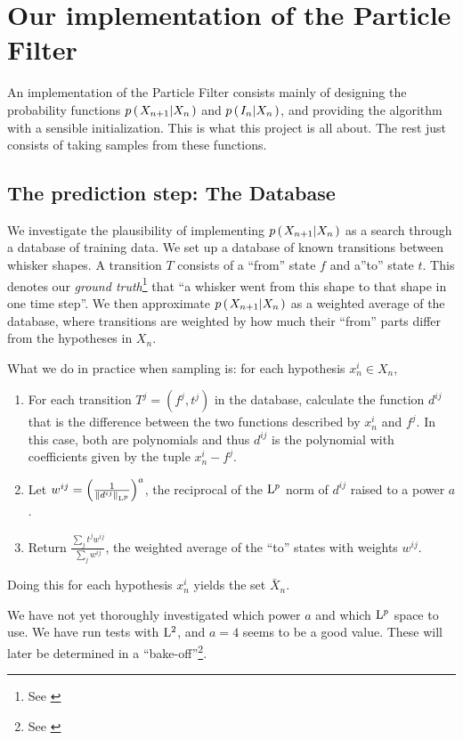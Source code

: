 \section*{Our implementation of the Particle Filter}
An implementation of the Particle Filter consists mainly of designing the probability functions $p\left(\left. X_{n+1} \middle\vert X_n \right.\right)$ and $p\left(\left. I_n \middle\vert X_n \right.\right)$, and providing the algorithm with a sensible initialization. This is what this project is all about. The rest just consists of taking samples from these functions.

\subsection*{The prediction step: The Database}

We investigate the plausibility of implementing $p\left(\left. X_{n+1} \middle\vert X_n \right.\right)$ as a search through a database of training data. We set up a database of known transitions between whisker shapes. A transition $T$ consists of a ``from'' state $f$ and a''to'' state $t$. This denotes our \emph{ground truth}\footnote{See \cite{EncyclopediaMachineLearning}} that ``a whisker went from this shape to that shape in one time step''. We then approximate $p\left(\left. X_{n+1} \middle\vert X_n \right.\right)$ as a weighted average of the database, where transitions are weighted by how much their ``from'' parts differ from the hypotheses in $X_n$.

What we do in practice when sampling is: for each hypothesis $x_n^i \in X_n$,

\begin{enumerate}
  \item For each transition $T^j = (f^j, t^j)$ in the database, calculate the function $d^{ij}$ that is the difference between the two functions described by $x_n^i$ and $f^j$. In this case, both are polynomials and thus $d^{ij}$ is the polynomial with coefficients given by the tuple $x_n^i - f^j$.
  \item Let $w^{ij} = \left(\frac{1}{\left\|d^{ij}\right\|_{\mathrm{L}^{p}}}\right)^a$, the reciprocal of the $\mathrm{L}^{p}$ norm of $d^{ij}$ raised to a power $a$.
  \item Return $\frac{\sum_j t^j w^{ij}}{\sum_jw^{ij}}$, the weighted average of the ``to'' states with weights $w^{ij}$.
\end{enumerate}

Doing this for each hypothesis $x_n^i$ yields the set $\bar{X}_n$.

We have not yet thoroughly investigated which power $a$ and which $\mathrm{L}^{p}$ space to use. We have run tests with $\mathrm{L}^{2}$, and $a=4$ seems to be a good value. These will later be determined in a ``bake-off''\footnote{See \cite{EncyclopediaMachineLearning}}.

